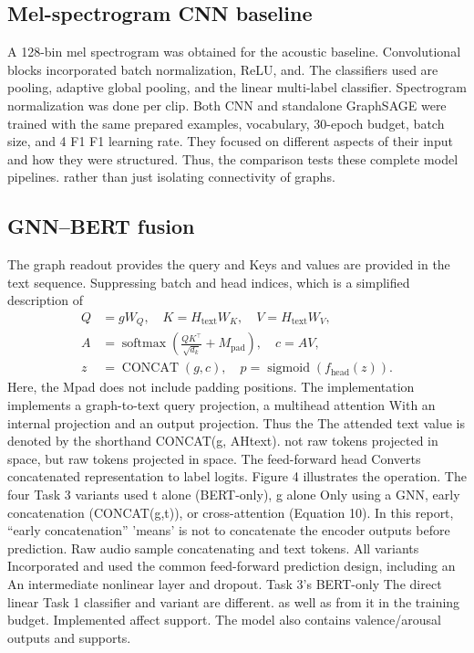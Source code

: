\documentclass[10pt,twocolumn,letterpaper]{article}
\newcommand{\concat}{\operatorname{CONCAT}}
\newcommand{\softmax}{\operatorname{softmax}}
\newcommand{\sigmoid}{\operatorname{sigmoid}}
\begin{document}
\subsection{Mel-spectrogram CNN baseline}
A 128-bin mel spectrogram was obtained for the acoustic baseline. Convolutional blocks incorporated batch normalization, ReLU, and. The classifiers used are pooling, adaptive global pooling, and the linear multi-label classifier. Spectrogram normalization was done per clip. Both CNN and standalone GraphSAGE were trained with the same prepared examples, vocabulary, 30-epoch budget, batch size, and 4 F1 F1 learning rate. They focused on different aspects of their input and how they were structured. Thus, the comparison tests these complete model pipelines. rather than just isolating connectivity of graphs.

\subsection{GNN--BERT fusion}
The graph readout provides the query and Keys and values are provided in the text sequence. Suppressing batch and head indices, which is a simplified description of
\begin{align}
Q&=gW_Q,\quad K=H_{\mathrm{text}}W_K,\quad V=H_{\mathrm{text}}W_V,\\
A&=\softmax\!\left(\frac{QK^\top}{\sqrt{d_k}}+M_{\mathrm{pad}}\right),\quad c=AV,
\label{eq:attention}\\
z&=\concat(g,c),\quad p=\sigmoid\!\left(f_{\mathrm{head}}(z)\right).
\label{eq:fusion}
\end{align}
Here, the Mpad does not include padding positions. The implementation implements a graph-to-text query projection, a multihead attention With an internal projection and an output projection. Thus the The attended text value is denoted by the shorthand CONCAT(g, AHtext). not raw tokens projected in space, but raw tokens projected in space. The feed-forward head Converts concatenated representation to label logits. Figure 4 illustrates the operation. The four Task 3 variants used t alone (BERT-only), g alone Only using a GNN, early concatenation (CONCAT(g,t)), or cross-attention (Equation 10). In this report, ``early concatenation'' 'means' is not to concatenate the encoder outputs before prediction. Raw audio sample concatenating and text tokens. All variants Incorporated and used the common feed-forward prediction design, including an An intermediate nonlinear layer and dropout. Task 3's BERT-only The direct linear Task 1 classifier and variant are different. as well as from it in the training budget. Implemented affect support. The model also contains valence/arousal outputs and supports.
\end{document}
